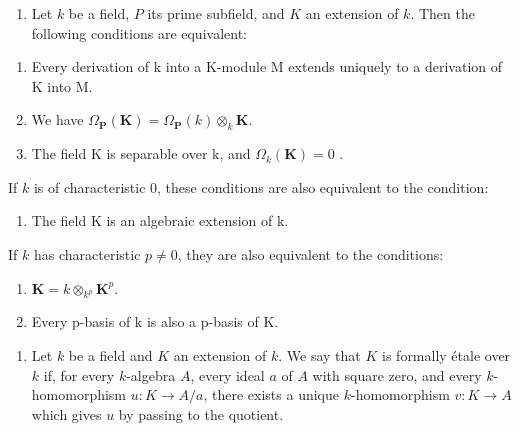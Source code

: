 \begin{enumerate}
\def\labelenumi{\arabic{enumi})}
\setcounter{enumi}{6}
\tightlist
\item
  Let \(k\) be a field, \(P\) its prime subfield, and \(K\) an extension of \(k\). Then the following conditions are equivalent:
\end{enumerate}

\begin{enumerate}
\def\labelenumi{\alph{enumi})}
\item
  Every derivation of k into a K-module M extends uniquely to a derivation of K into M.
\item
  We have \(\Omega_{\mathbf{P}}(\mathbf{K}) = \Omega_{\mathbf{P}}(k)\otimes_k\mathbf{K}\).
\item
  The field K is separable over k, and \(\Omega_{k}(\mathbf{K}) = 0\) .
\end{enumerate}

If \(k\) is of characteristic 0, these conditions are also equivalent to the condition:

\begin{enumerate}
\def\labelenumi{\alph{enumi})}
\setcounter{enumi}{3}
\tightlist
\item
  The field K is an algebraic extension of k.
\end{enumerate}

If \(k\) has characteristic \(p\ne0\), they are also equivalent to the conditions:

\begin{enumerate}
\def\labelenumi{\alph{enumi})}
\setcounter{enumi}{4}
\item
  \(\mathbf{K} = k\otimes_{k^p}\mathbf{K}^p.\)
\item
  Every p-basis of k is also a p-basis of K.
\end{enumerate}

\begin{enumerate}
\def\labelenumi{\arabic{enumi})}
\setcounter{enumi}{7}
\tightlist
\item
  Let \(k\) be a field and \(K\) an extension of \(k\). We say that \(K\) is formally étale over \(k\) if, for every \(k\)-algebra \(A\), every ideal \(a\) of \(A\) with square zero, and every \(k\)-homomorphism \(u:K\to A/a\), there exists a unique \(k\)-homomorphism \(v:K\to A\) which gives \(u\) by passing to the quotient.
\end{enumerate}

